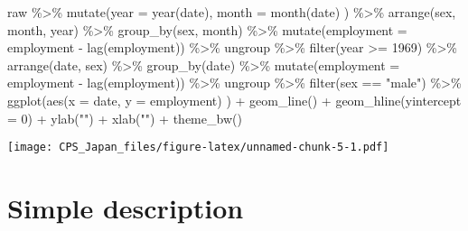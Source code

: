 \documentclass[
]{book}
\newenvironment{Shaded}{\begin{snugshade}}{\end{snugshade}}
\newcommand{\AttributeTok}[1]{\textcolor[rgb]{0.77,0.63,0.00}{#1}}
\newcommand{\DecValTok}[1]{\textcolor[rgb]{0.00,0.00,0.81}{#1}}
\newcommand{\FunctionTok}[1]{\textcolor[rgb]{0.00,0.00,0.00}{#1}}
\newcommand{\NormalTok}[1]{#1}
\newcommand{\SpecialCharTok}[1]{\textcolor[rgb]{0.00,0.00,0.00}{#1}}
\newcommand{\StringTok}[1]{\textcolor[rgb]{0.31,0.60,0.02}{#1}}
\begin{document}
\begin{Shaded}
\begin{Highlighting}[]
\NormalTok{raw }\SpecialCharTok{\%\textgreater{}\%}
  \FunctionTok{mutate}\NormalTok{(}\AttributeTok{year =} \FunctionTok{year}\NormalTok{(date),}
         \AttributeTok{month =} \FunctionTok{month}\NormalTok{(date)}
\NormalTok{         ) }\SpecialCharTok{\%\textgreater{}\%}
  \FunctionTok{arrange}\NormalTok{(sex,}
\NormalTok{          month,}
\NormalTok{          year) }\SpecialCharTok{\%\textgreater{}\%}
  \FunctionTok{group\_by}\NormalTok{(sex,}
\NormalTok{           month) }\SpecialCharTok{\%\textgreater{}\%}
  \FunctionTok{mutate}\NormalTok{(}\AttributeTok{employment =}\NormalTok{ employment }\SpecialCharTok{{-}} \FunctionTok{lag}\NormalTok{(employment)) }\SpecialCharTok{\%\textgreater{}\%}
\NormalTok{  ungroup }\SpecialCharTok{\%\textgreater{}\%}
  \FunctionTok{filter}\NormalTok{(year }\SpecialCharTok{\textgreater{}=} \DecValTok{1969}\NormalTok{) }\SpecialCharTok{\%\textgreater{}\%}
  \FunctionTok{arrange}\NormalTok{(date,}
\NormalTok{          sex) }\SpecialCharTok{\%\textgreater{}\%}
  \FunctionTok{group\_by}\NormalTok{(date) }\SpecialCharTok{\%\textgreater{}\%}
  \FunctionTok{mutate}\NormalTok{(}\AttributeTok{employment =}\NormalTok{ employment }\SpecialCharTok{{-}} \FunctionTok{lag}\NormalTok{(employment)) }\SpecialCharTok{\%\textgreater{}\%}
\NormalTok{  ungroup }\SpecialCharTok{\%\textgreater{}\%}
  \FunctionTok{filter}\NormalTok{(sex }\SpecialCharTok{==} \StringTok{"male"}\NormalTok{) }\SpecialCharTok{\%\textgreater{}\%}
  \FunctionTok{ggplot}\NormalTok{(}\FunctionTok{aes}\NormalTok{(}\AttributeTok{x =}\NormalTok{ date,}
             \AttributeTok{y =}\NormalTok{ employment)}
\NormalTok{         ) }\SpecialCharTok{+}
  \FunctionTok{geom\_line}\NormalTok{() }\SpecialCharTok{+}
  \FunctionTok{geom\_hline}\NormalTok{(}\AttributeTok{yintercept =} \DecValTok{0}\NormalTok{) }\SpecialCharTok{+}
  \FunctionTok{ylab}\NormalTok{(}\StringTok{""}\NormalTok{) }\SpecialCharTok{+}
  \FunctionTok{xlab}\NormalTok{(}\StringTok{""}\NormalTok{) }\SpecialCharTok{+}
  \FunctionTok{theme\_bw}\NormalTok{()}
\end{Highlighting}
\end{Shaded}

\texttt{[image: CPS\_Japan\_files/figure-latex/unnamed-chunk-5-1.pdf]}

\hypertarget{simple-description}{%
\chapter{Simple description}\label{simple-description}}
\end{document}
